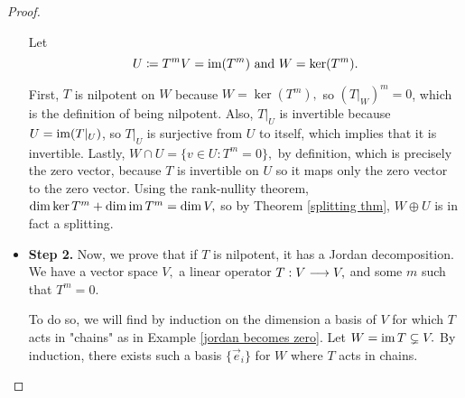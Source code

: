 \begin{proof}
\begin{itemize}
        Let 
    \[
    U \coloneqq T^mV = \operatorname{im}(T^m)
    \text{ and }
    W = \ker(T^m).
    \]
    
    First, $T$ is nilpotent on $W$ because $W = \ker(T^m),$ so $(T |_W)^m = 0$, which is the definition of being nilpotent. Also, $T|_U$ is invertible because $U = \operatorname{im}(T|_U)$, so $T|_U$ is surjective from $U$ to itself, which implies that it is invertible. Lastly, $W \cap U = \{v \in U: T^m = 0\},$ by definition, which is precisely the zero vector, because $T$ is invertible on $U$ so it maps only the zero vector to the zero vector. Using the rank-nullity theorem, $\dim \ker T^m + \dim \operatorname{im} T^m = \dim V, $ so by Theorem \ref{splitting thm}, $W \oplus U$ is in fact a splitting.
    
    \item \textbf{Step 2.} Now, we prove that if $T$ is nilpotent, it has a Jordan decomposition. We have a vector space $V,$ a linear operator $T: V \longrightarrow V,$ and some $m$ such that $T^m = 0.$
    
    To do so, we will find by induction on the dimension a basis of $V$ for which $T$ acts in "chains" as in Example \ref{jordan becomes zero}. Let $W = \operatorname{im} T \subsetneq V.$ By induction, there exists such a basis $\{\vec{e}_i\}$ for $W$ where $T$ acts in chains.
    

\end{itemize}
\end{proof}
